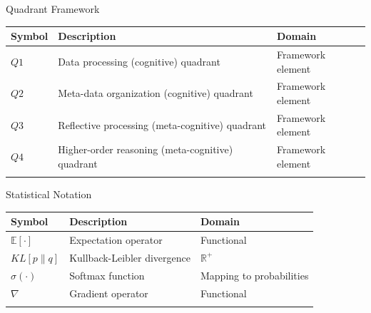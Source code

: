 \documentclass[
  ignorenonframetext,
]{beamer}
\newcounter{none} %
\begin{document}
\begin{frame}{Quadrant Framework}
\protect{}\label{quadrant-framework}
{\def\LTcaptype{none} %
\begin{longtable}[]{@{}
  >{\raggedright\arraybackslash}p{}
  >{\raggedright\arraybackslash}p{}
  >{\raggedright\arraybackslash}p{}@{}}
\toprule\noalign{}
\begin{minipage}[b]{\linewidth}\raggedright
Symbol
\end{minipage} & \begin{minipage}[b]{\linewidth}\raggedright
Description
\end{minipage} & \begin{minipage}[b]{\linewidth}\raggedright
Domain
\end{minipage} \\
\midrule\noalign{}
\endhead
\(Q1\) & Data processing (cognitive) quadrant & Framework element \\
\(Q2\) & Meta-data organization (cognitive) quadrant & Framework
element \\
\(Q3\) & Reflective processing (meta-cognitive) quadrant & Framework
element \\
\(Q4\) & Higher-order reasoning (meta-cognitive) quadrant & Framework
element \\
\bottomrule\noalign{}
\end{longtable}
}
\end{frame}

\begin{frame}{Statistical Notation}
\protect{}\label{statistical-notation}
{\def\LTcaptype{none} %
\begin{longtable}[]{@{}lll@{}}
\toprule\noalign{}
Symbol & Description & Domain \\
\midrule\noalign{}
\endhead
\(\mathbb{E}[\cdot]\) & Expectation operator & Functional \\
\(KL[p\|q]\) & Kullback-Leibler divergence & \(\mathbb{R}^+\) \\
\(\sigma(\cdot)\) & Softmax function & Mapping to probabilities \\
\(\nabla\) & Gradient operator & Functional \\
\bottomrule\noalign{}
\end{longtable}
}
\end{frame}
\end{document}
